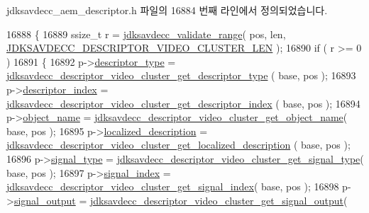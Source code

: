 jdksavdecc\+\_\+aem\+\_\+descriptor.\+h 파일의 16884 번째 라인에서 정의되었습니다.


\begin{DoxyCode}
16888 \{
16889     ssize\_t r = \hyperlink{group__util_ga9c02bdfe76c69163647c3196db7a73a1}{jdksavdecc\_validate\_range}( pos, len, 
      \hyperlink{group__descriptor__video__cluster_gad9866f1282631e70b01a84c6a9bf5187}{JDKSAVDECC\_DESCRIPTOR\_VIDEO\_CLUSTER\_LEN} );
16890     \textcolor{keywordflow}{if} ( r >= 0 )
16891     \{
16892         p->\hyperlink{structjdksavdecc__descriptor__video__unit__cluster_ab7c32b6c7131c13d4ea3b7ee2f09b78d}{descriptor\_type} = 
      \hyperlink{group__descriptor__video__cluster_ga2eac6efa7af578446c3e39083b4f4db9}{jdksavdecc\_descriptor\_video\_cluster\_get\_descriptor\_type}
      ( base, pos );
16893         p->\hyperlink{structjdksavdecc__descriptor__video__unit__cluster_a042bbc76d835b82d27c1932431ee38d4}{descriptor\_index} = 
      \hyperlink{group__descriptor__video__cluster_ga24c6f14f0461ccecfe3b391545603bd3}{jdksavdecc\_descriptor\_video\_cluster\_get\_descriptor\_index}
      ( base, pos );
16894         p->\hyperlink{structjdksavdecc__descriptor__video__unit__cluster_a7d1f5945a13863b1762fc6db74fa8f80}{object\_name} = 
      \hyperlink{group__descriptor__video__cluster_ga1e1aee2e93f52abba56bc1ade7759d01}{jdksavdecc\_descriptor\_video\_cluster\_get\_object\_name}( 
      base, pos );
16895         p->\hyperlink{structjdksavdecc__descriptor__video__unit__cluster_a0926f846ca65a83ad5bb06b4aff8f408}{localized\_description} = 
      \hyperlink{group__descriptor__video__cluster_ga084e23b44e990a36da2ddac6337458de}{jdksavdecc\_descriptor\_video\_cluster\_get\_localized\_description}
      ( base, pos );
16896         p->\hyperlink{structjdksavdecc__descriptor__video__unit__cluster_a248e60ef99d5ed1779989d1dd6b6dc5a}{signal\_type} = 
      \hyperlink{group__descriptor__video__cluster_ga705aaaadcdcffb15854b9b0cffbcd10c}{jdksavdecc\_descriptor\_video\_cluster\_get\_signal\_type}( 
      base, pos );
16897         p->\hyperlink{structjdksavdecc__descriptor__video__unit__cluster_ae2e81a95ee9ad83f1fe22b6a1ee29075}{signal\_index} = 
      \hyperlink{group__descriptor__video__cluster_gad55e9a8c1ebd663db279f9dfea142dcc}{jdksavdecc\_descriptor\_video\_cluster\_get\_signal\_index}( 
      base, pos );
16898         p->\hyperlink{structjdksavdecc__descriptor__video__unit__cluster_ab4b91864e6fc335d7e86536d9f4461e4}{signal\_output} = 
      \hyperlink{group__descriptor__video__cluster_ga4cf550fcca0e4b4ff9734ad65703c60d}{jdksavdecc\_descriptor\_video\_cluster\_get\_signal\_output}(

\end{DoxyCode}
